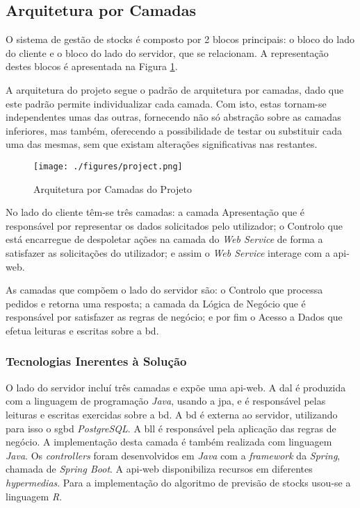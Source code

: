 %
%
\subsection{Arquitetura por Camadas}\label{subsec222}

O sistema de gestão de stocks é composto por 2 blocos principais: o bloco do lado do cliente e o bloco do lado do servidor, que se relacionam. A representação destes blocos é apresentada na Figura \ref{project-layers-structure}.

A arquitetura do projeto segue o padrão de arquitetura por camadas, dado que este padrão permite individualizar cada camada. Com isto, estas tornam-se independentes umas das outras, fornecendo não só abstração sobre as camadas inferiores, mas também, oferecendo a possibilidade de testar ou substituir cada uma das mesmas, sem que existam alterações significativas nas restantes.

\begin{figure}[H]
	\centering
	\texttt{[image: ./figures/project.png]}
	\caption{Arquitetura por Camadas do Projeto}
	\label{project-layers-structure}
\end{figure}

No lado do cliente têm-se três camadas: a camada Apresentação que é responsável por representar os dados solicitados pelo utilizador; o Controlo que está encarregue de despoletar ações na camada do \textit{Web Service} de forma a satisfazer as solicitações do utilizador; e assim o \textit{Web Service} interage com a \gls{api-web}. 

As camadas que compõem o lado do servidor são: o Controlo que processa pedidos e retorna uma resposta; a camada da Lógica de Negócio que é responsável por satisfazer as regras de negócio; e por fim o Acesso a Dados que efetua leituras e escritas sobre a \acrshort{bd}.

\subsubsection{Tecnologias Inerentes à Solução}

O lado do servidor incluí três camadas e expõe uma \gls{api-web}. A \acrfull{dal} é produzida com a linguagem de programação \textit{Java}, usando a \acrfull{jpa}, e é responsável pelas leituras e escritas exercidas sobre a \acrfull{bd}. A \acrshort{bd} é externa ao servidor, utilizando para isso o \acrfull{sgbd} \textit{PostgreSQL}. A \acrfull{bll} é responsável pela aplicação das regras de negócio. A implementação desta camada é também realizada com linguagem \textit{Java}. Os \textit{controllers} foram desenvolvidos em \textit{Java} com a \textit{framework} da \textit{Spring}, chamada de \textit{Spring Boot}. A \gls{api-web} disponibiliza recursos em diferentes \textit{hypermedias}. Para a implementação do algoritmo de previsão de stocks usou-se a linguagem \textit{R}.

